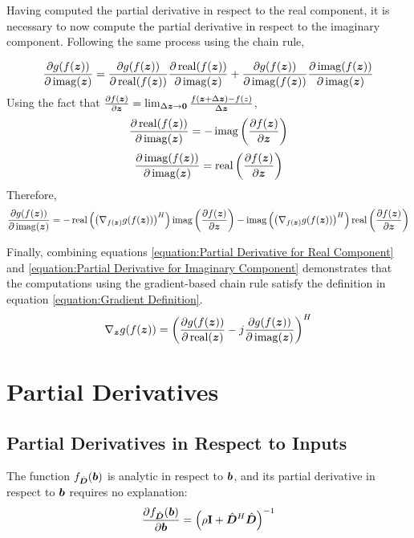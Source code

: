 \begin{appendices}
Having computed the partial derivative in respect to the real component, it is necessary to now compute the partial derivative in respect to the imaginary component. Following the same process using the chain rule,

\begin{equation}
\frac{\partial g(f(\bm{z}))}{\partial \operatorname{imag}(\bm{z})} = \frac{\partial g(f(\bm{z}))}{\partial \operatorname{real}(f(\bm{z}))}\frac{\partial \operatorname{real}(f(\bm{z}))}{\partial \operatorname{imag}(\bm{z})} + \frac{\partial g(f(\bm{z}))}{\partial \operatorname{imag}(f(\bm{z}))}\frac{\partial \operatorname{imag}(f(\bm{z}))}{\partial \operatorname{imag}(\bm{z})}
\end{equation}
Using the fact that $\frac{\partial f(\bm{z})}{\partial \bm{z}} = \lim_{\Delta \bm{z} \rightarrow \bm{0}} \frac{f(\bm{z} + \Delta \bm{z}) - f(z)}{\Delta \bm{z}}$,
\begin{equation}
\frac{\partial \operatorname{real}(f(\bm{z}))}{\partial \operatorname{imag}(\bm{z})} = -\operatorname{imag}\left(\frac{\partial f(\bm{z})}{\partial \bm{z}}\right)
\end{equation}
\begin{equation}
\frac{\partial \operatorname{imag}(f(\bm{z}))}{\partial \operatorname{imag}(\bm{z})} = \operatorname{real}\left(\frac{\partial f(\bm{z})}{\partial \bm{z}}\right)
\end{equation}
Therefore,
\begin{equation}\label{equation:Partial Derivative for Imaginary Component}
\frac{\partial g(f(\bm{z}))}{\partial \operatorname{imag}(\bm{z})} = -\operatorname{real}\left(\left(\nabla_{f(\bm{z})} g(f(\bm{z}))\right)^H\right)\operatorname{imag}\left(\frac{\partial f(\bm{z})}{\partial \bm{z}}\right) - \operatorname{imag}\left(\left(\nabla_{f(\bm{z})} g(f(\bm{z}))\right)^H\right)\operatorname{real}\left(\frac{\partial f(\bm{z})}{\partial \bm{z}}\right)
\end{equation}

Finally, combining equations \ref{equation:Partial Derivative for Real Component} and \ref{equation:Partial Derivative for Imaginary Component} demonstrates that the computations using the gradient-based chain rule satisfy the definition in equation \ref{equation:Gradient Definition}.
\begin{equation}
\nabla_{\bm{z}} g(f(\bm{z})) = \left(\frac{\partial g(f(\bm{z}))}{\partial \operatorname{real}(\bm{z})} - j\frac{\partial g(f(\bm{z}))}{\partial \operatorname{imag}(\bm{z})}\right)^H
\end{equation}

\section{Partial Derivatives}

\subsection{Partial Derivatives in Respect to Inputs}
The function $f_{\hat{\bm{D}}}(\bm{b})$ is analytic in respect to $\bm{b}$, and its partial derivative in respect to $\bm{b}$ requires no explanation:
\begin{equation}
\frac{\partial f_{\hat{\bm{D}}}(\bm{b})}{\partial \bm{b}} = \left(\rho{\bf I} + \hat{\bm{D}}^H\hat{\bm{D}}\right)^{-1}
\end{equation}


\end{appendices}
